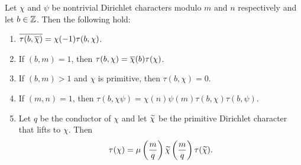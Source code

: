       \begin{proposition}\label{prop:Gauss_sum_reduction}
        Let $\chi$ and $\psi$ be nontrivial Dirichlet characters modulo $m$ and $n$ respectively and let $b \in \mathbb{Z}$. Then the following hold:
        \begin{enumerate}[label=(\roman*)]
          \item $\overline{\tau(b,\overline{\chi})} = \chi(-1)\tau(b,\chi)$.
          \item If $(b,m) = 1$, then $\tau(b,\chi) = \overline{\chi}(b)\tau(\chi)$.
          \item If $(b,m) > 1$ and $\chi$ is primitive, then $\tau(b,\chi) = 0$.
          \item If $(m,n) = 1$, then $\tau(b,\chi\psi) = \chi(n)\psi(m)\tau(b,\chi)\tau(b,\psi)$.
          \item Let $q$ be the conductor of $\chi$ and let $\widetilde{\chi}$ be the primitive Dirichlet character that lifts to $\chi$. Then
          \[
            \tau(\chi) = \mu\left(\frac{m}{q}\right)\widetilde{\chi}\left(\frac{m}{q}\right)\tau(\widetilde{\chi}).
          \]
        \end{enumerate}
      \end{proposition}
